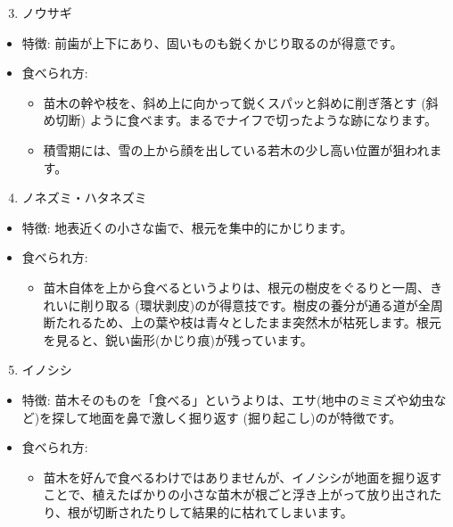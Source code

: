 \documentclass[a4paper, 11pt]{jsarticle}
\begin{document}
\begin{enumerate}
    \setcounter{enumi}{2}
    \item ノウサギ
\end{enumerate}
\begin{itemize}
    \item 特徴: 前歯が上下にあり、固いものも鋭くかじり取るのが得意です。
    \item 食べられ方:
    \begin{itemize}
        \item[○] 苗木の幹や枝を、斜め上に向かって鋭くスパッと斜めに削ぎ落とす (斜め切断) ように食べます。まるでナイフで切ったような跡になります。
        \item[○] 積雪期には、雪の上から顔を出している若木の少し高い位置が狙われます。
    \end{itemize}
\end{itemize}
\begin{enumerate}
    \setcounter{enumi}{3}
    \item ノネズミ・ハタネズミ
\end{enumerate}
\begin{itemize}
    \item 特徴: 地表近くの小さな歯で、根元を集中的にかじります。
    \item 食べられ方:
    \begin{itemize}
        \item[○] 苗木自体を上から食べるというよりは、根元の樹皮をぐるりと一周、きれいに削り取る (環状剥皮)のが得意技です。樹皮の養分が通る道が全周断たれるため、上の葉や枝は青々としたまま突然木が枯死します。根元を見ると、鋭い歯形(かじり痕)が残っています。
    \end{itemize}
\end{itemize}
\begin{enumerate}
    \setcounter{enumi}{4}
    \item イノシシ
\end{enumerate}
\begin{itemize}
    \item 特徴: 苗木そのものを「食べる」というよりは、エサ(地中のミミズや幼虫など)を探して地面を鼻で激しく掘り返す (掘り起こし)のが特徴です。
    \item 食べられ方:
    \begin{itemize}
        \item[○] 苗木を好んで食べるわけではありませんが、イノシシが地面を掘り返すことで、植えたばかりの小さな苗木が根ごと浮き上がって放り出されたり、根が切断されたりして結果的に枯れてしまいます。
    \end{itemize}
\end{itemize}
\end{document}
